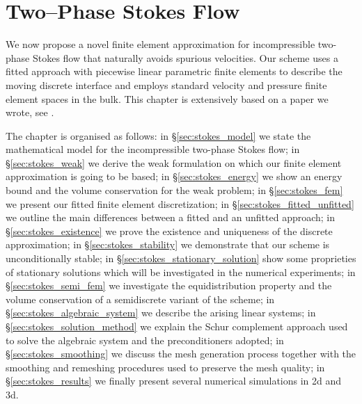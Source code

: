 \chapter{\sc Two--Phase Stokes Flow}\label{ch:stokes}
We now propose a novel finite element approximation for incompressible
two-phase Stokes flow that naturally avoids spurious velocities. Our scheme uses
a fitted approach with piecewise linear parametric finite elements to describe
the moving discrete interface and employs standard velocity and pressure finite
element spaces in the bulk. This chapter is extensively based on a paper we
wrote, see \cite{stokesfitted}.

The chapter is organised as follows: in \S\ref{sec:stokes_model} we state the
mathematical model for the incompressible two-phase Stokes flow; in
\S\ref{sec:stokes_weak} we derive the weak formulation on which our finite
element approximation is going to be based; in \S\ref{sec:stokes_energy} we show
an energy bound and the volume conservation for the weak problem; in
\S\ref{sec:stokes_fem} we present our fitted finite element discretization; in
\S\ref{sec:stokes_fitted_unfitted} we outline the main differences between a
fitted and an unfitted approach; in \S\ref{sec:stokes_existence} we prove the
existence and uniqueness of the discrete approximation; in
\S\ref{sec:stokes_stability} we demonstrate that our scheme is unconditionally
stable; in \S\ref{sec:stokes_stationary_solution} show some proprieties of
stationary solutions which will be investigated in the numerical experiments; in
\S\ref{sec:stokes_semi_fem} we investigate the equidistribution property and the
volume conservation of a semidiscrete variant of the scheme; in
\S\ref{sec:stokes_algebraic_system} we describe the arising linear systems; in
\S\ref{sec:stokes_solution_method} we explain the Schur complement approach used
to solve the algebraic system and the preconditioners adopted; in
\S\ref{sec:stokes_smoothing} we discuss the mesh generation process together
with the smoothing and remeshing procedures used to preserve the mesh quality;
in \S\ref{sec:stokes_results} we finally present several numerical simulations
in 2d and 3d.

